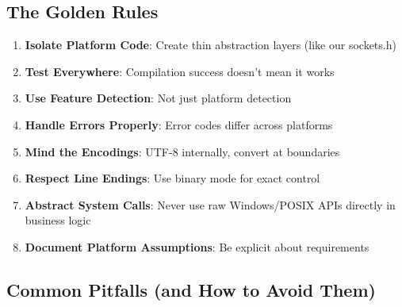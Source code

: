\subsection{The Golden Rules}

\begin{enumerate}
    \item \textbf{Isolate Platform Code}: Create thin abstraction layers (like our sockets.h)
    \item \textbf{Test Everywhere}: Compilation success doesn't mean it works
    \item \textbf{Use Feature Detection}: Not just platform detection
    \item \textbf{Handle Errors Properly}: Error codes differ across platforms
    \item \textbf{Mind the Encodings}: UTF-8 internally, convert at boundaries
    \item \textbf{Respect Line Endings}: Use binary mode for exact control
    \item \textbf{Abstract System Calls}: Never use raw Windows/POSIX APIs directly in business logic
    \item \textbf{Document Platform Assumptions}: Be explicit about requirements
\end{enumerate}

\subsection{Common Pitfalls (and How to Avoid Them)}

